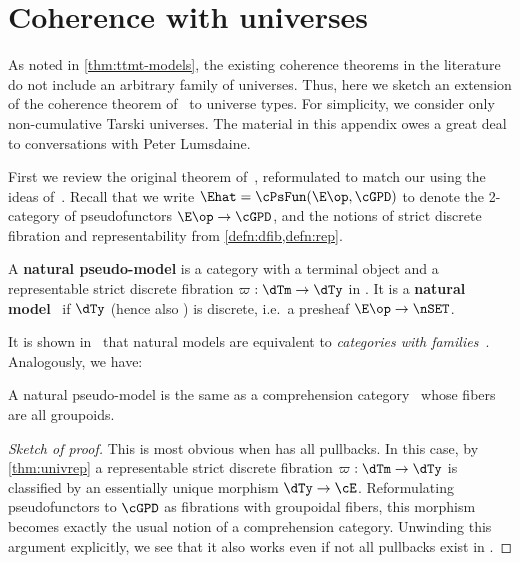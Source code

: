 \section{Coherence with universes}
\label{sec:coherence}

As noted in \cref{thm:ttmt-models}, the existing coherence theorems in the literature~\cite{klv:ssetmodel,lw:localuniv,awodey:natmodels} do not include an arbitrary family of universes.
Thus, here we sketch an extension of the coherence theorem of~\cite{lw:localuniv} to universe types.
For simplicity, we consider only non-cumulative Tarski universes.
The material in this appendix owes a great deal to conversations with Peter Lumsdaine.

First we review the original theorem of~\cite{lw:localuniv}, reformulated to match our  using the ideas of~\cite{awodey:natmodels}.
Recall that we write $\Ehat = \cPsFun(\E\op,\cGPD)$ to denote the 2-category of pseudofunctors $\E\op\to\cGPD$, and the notions of strict discrete fibration and representability from \cref{defn:dfib,defn:rep}.

\begin{defn}
  A \textbf{natural pseudo-model} is a category \E with a terminal object and a representable strict discrete fibration $\varpi:\dTm\to\dTy$ in \Ehat.
  It is a \textbf{natural model}~\cite{awodey:natmodels} if $\dTy$ (hence also \dTm) is discrete, i.e.\ a presheaf $\E\op\to\nSET$.
\end{defn}

It is shown in~\cite{awodey:natmodels} that natural models are equivalent to \emph{categories with families}~\cite{dybjer:internal-tt}.
Analogously, we have:

\begin{lem}
  A natural pseudo-model is the same as a comprehension category~\cite{jacobs:compr-cat} whose fibers are all groupoids.
\end{lem}
\begin{proof}[Sketch of proof]
  This is most obvious when \E has all pullbacks.
  In this case, by \cref{thm:univrep} a representable strict discrete fibration $\varpi:\dTm\to\dTy$ is classified by an essentially unique morphism $\dTy\to\cE$.
  Reformulating pseudofunctors to $\cGPD$ as fibrations with groupoidal fibers, this morphism becomes exactly the usual notion of a comprehension category.
  Unwinding this argument explicitly, we see that it also works even if not all pullbacks exist in \E.
\end{proof}

